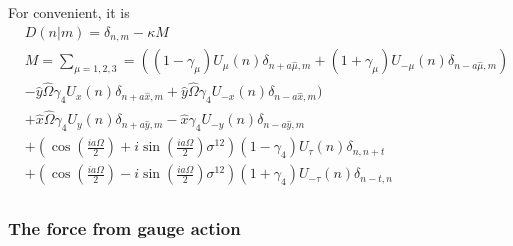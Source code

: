 For convenient, it is
\textcolor[rgb]{0,0,0.8}{
\begin{equation}
\begin{split}
&D(n|m)=\delta _{n,m}-\kappa M\\
&M=\sum _{\mu = 1,2,3}=\left((1-\gamma _{\mu})U_{\mu}(n)\delta _{n+a\hat{\mu},m}+(1+\gamma _{\mu})U_{-\mu}(n)\delta _{n-a\hat{\mu},m}\right)\\
&-\hat{y}\hat{\Omega} \gamma _4 U_{x}(n)\delta _{n+a\hat{x},m}+\hat{y}\hat{\Omega}\gamma _4 U_{-x}(n)\delta _{n-a\hat{x},m})\\
&+\hat{x}\hat{\Omega} \gamma _4 U_{y}(n)\delta _{n+a\hat{y},m}-\hat{x}\gamma _4U_{-y}(n)\delta _{n-a\hat{y},m}\\
&+\left(\cos\left(\frac{ia\Omega }{2}\right)+i\sin\left(\frac{ia\Omega }{2}\right)\sigma ^{12}\right)(1-\gamma _4)U_{\tau}(n)\delta _{n,n+t}\\
&+\left(\cos\left(\frac{ia\Omega }{2}\right)-i\sin\left(\frac{ia\Omega }{2}\right)\sigma ^{12}\right)(1+\gamma _4) U_{-\tau}(n)\delta _{n-t,n}\\
\end{split}
\end{equation}
}


\subsubsection{\label{sec:ForceFromGaugeAction}The force from gauge action}

